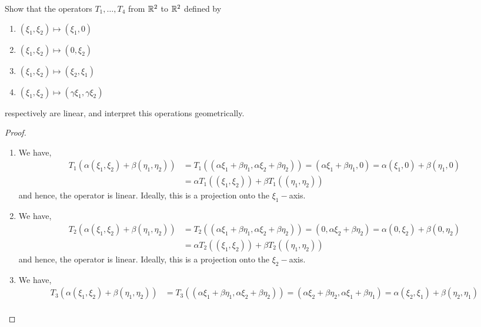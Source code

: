\begin{question}
    Show that the operators $T_1 , \ldots , T_4$ from $\mathbb{R}^2$ to $\mathbb{R}^2$ defined by
    \begin{enumerate}
        \item $(\xi_1 , \xi_2) \mapsto (\xi_1 , 0)$
        \item $(\xi_1 , \xi_2) \mapsto (0,\xi_2)$
        \item $(\xi_1 , \xi_2) \mapsto (\xi_2 , \xi_1)$
        \item $(\xi_1 ,\xi_2) \mapsto (\gamma \xi_1 , \gamma \xi_2)$
    \end{enumerate}
    respectively are linear, and interpret this operations geometrically.
    \label{section2.6-2}
\end{question}
\begin{proof}
    \begin{enumerate}
        \item We have,
        \begin{align*}
            T_1(\alpha(\xi_1 , \xi_2) + \beta(\eta_1 , \eta_2)) &= T_1((\alpha \xi_1 + \beta \eta_1 , \alpha \xi_2 + \beta \eta_2)) 
            = (\alpha \xi_1 + \beta \eta_1 , 0) 
            = \alpha (\xi_1 , 0) + \beta (\eta_1 , 0) \\
            &= \alpha T_1((\xi_1 , \xi_2)) + \beta T_1((\eta_1 , \eta_2))
        \end{align*} 
        and hence, the operator is linear. Ideally, this is a projection onto the $\xi_1-$axis.
        \item We have,
        \begin{align*}
            T_2(\alpha(\xi_1 , \xi_2) + \beta(\eta_1 , \eta_2)) &= T_2((\alpha \xi_1 + \beta \eta_1 , \alpha \xi_2 + \beta \eta_2)) 
            = (0 , \alpha \xi_2 + \beta \eta_2) 
            = \alpha (0 , \xi_2) + \beta (0 , \eta_2) \\
            &= \alpha T_2((\xi_1 , \xi_2)) + \beta T_2((\eta_1 , \eta_2))
        \end{align*} 
        and hence, the operator is linear. Ideally, this is a projection onto the $\xi_2-$axis.
        \item We have,
        \begin{align*}
            T_3(\alpha(\xi_1 , \xi_2) + \beta(\eta_1 , \eta_2)) &= T_3((\alpha \xi_1 + \beta \eta_1 , \alpha \xi_2 + \beta \eta_2)) 
            = (\alpha \xi_2 + \beta \eta_2 , \alpha \xi_1 + \beta \eta_1) 
            = \alpha (\xi_2 , \xi_1) + \beta (\eta_2 , \eta_1) \\

\end{align*}
\end{enumerate}
\end{proof}
